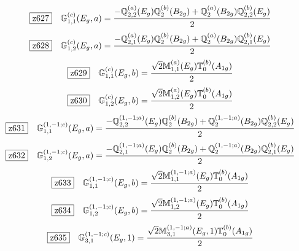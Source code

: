 \documentclass[fleqn,10pt,landscape]{jsarticle}
\begin{document}
\begin{dmath*}
\hspace*{3mm}\fbox{z627}\quad \mathbb{G}_{1,1}^{(c)}(E_{g},a)=\frac{- \mathbb{Q}_{2,2}^{(a)}(E_{g}) \mathbb{Q}_{2}^{(b)}(B_{2g}) + \mathbb{Q}_{2}^{(a)}(B_{2g}) \mathbb{Q}_{2,2}^{(b)}(E_{g})}{2}
\end{dmath*}
\begin{dmath*}
\hspace*{3mm}\fbox{z628}\quad \mathbb{G}_{1,2}^{(c)}(E_{g},a)=\frac{- \mathbb{Q}_{2,1}^{(a)}(E_{g}) \mathbb{Q}_{2}^{(b)}(B_{2g}) + \mathbb{Q}_{2}^{(a)}(B_{2g}) \mathbb{Q}_{2,1}^{(b)}(E_{g})}{2}
\end{dmath*}
\begin{dmath*}
\hspace*{3mm}\fbox{z629}\quad \mathbb{G}_{1,1}^{(c)}(E_{g},b)=\frac{\sqrt{2} \mathbb{M}_{1,1}^{(a)}(E_{g}) \mathbb{T}_{0}^{(b)}(A_{1g})}{2}
\end{dmath*}
\begin{dmath*}
\hspace*{3mm}\fbox{z630}\quad \mathbb{G}_{1,2}^{(c)}(E_{g},b)=\frac{\sqrt{2} \mathbb{M}_{1,2}^{(a)}(E_{g}) \mathbb{T}_{0}^{(b)}(A_{1g})}{2}
\end{dmath*}
\begin{dmath*}
\hspace*{3mm}\fbox{z631}\quad \mathbb{G}_{1,1}^{(1,-1;c)}(E_{g},a)=\frac{- \mathbb{Q}_{2,2}^{(1,-1;a)}(E_{g}) \mathbb{Q}_{2}^{(b)}(B_{2g}) + \mathbb{Q}_{2}^{(1,-1;a)}(B_{2g}) \mathbb{Q}_{2,2}^{(b)}(E_{g})}{2}
\end{dmath*}
\begin{dmath*}
\hspace*{3mm}\fbox{z632}\quad \mathbb{G}_{1,2}^{(1,-1;c)}(E_{g},a)=\frac{- \mathbb{Q}_{2,1}^{(1,-1;a)}(E_{g}) \mathbb{Q}_{2}^{(b)}(B_{2g}) + \mathbb{Q}_{2}^{(1,-1;a)}(B_{2g}) \mathbb{Q}_{2,1}^{(b)}(E_{g})}{2}
\end{dmath*}
\begin{dmath*}
\hspace*{3mm}\fbox{z633}\quad \mathbb{G}_{1,1}^{(1,-1;c)}(E_{g},b)=\frac{\sqrt{2} \mathbb{M}_{1,1}^{(1,-1;a)}(E_{g}) \mathbb{T}_{0}^{(b)}(A_{1g})}{2}
\end{dmath*}
\begin{dmath*}
\hspace*{3mm}\fbox{z634}\quad \mathbb{G}_{1,2}^{(1,-1;c)}(E_{g},b)=\frac{\sqrt{2} \mathbb{M}_{1,2}^{(1,-1;a)}(E_{g}) \mathbb{T}_{0}^{(b)}(A_{1g})}{2}
\end{dmath*}
\begin{dmath*}
\hspace*{3mm}\fbox{z635}\quad \mathbb{G}_{3,1}^{(1,-1;c)}(E_{g},1)=\frac{\sqrt{2} \mathbb{M}_{3,1}^{(1,-1;a)}(E_{g},1) \mathbb{T}_{0}^{(b)}(A_{1g})}{2}
\end{dmath*}
\end{document}
